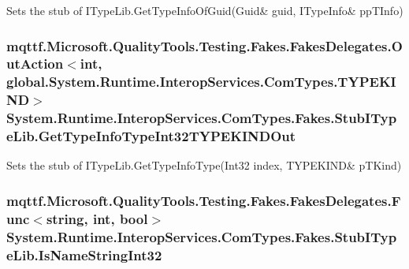 Sets the stub of I\-Type\-Lib.\-Get\-Type\-Info\-Of\-Guid(Guid\& guid, I\-Type\-Info\& pp\-T\-Info)

\hypertarget{class_system_1_1_runtime_1_1_interop_services_1_1_com_types_1_1_fakes_1_1_stub_i_type_lib_a513ec8c77d6a7c632a1a13e4b21d49e1}{
\subsubsection[{Get\-Type\-Info\-Type\-Int32\-T\-Y\-P\-E\-K\-I\-N\-D\-Out}]{\setlength{\rightskip}{0pt plus 5cm}mqttf.\-Microsoft.\-Quality\-Tools.\-Testing.\-Fakes.\-Fakes\-Delegates.\-Out\-Action$<$int, global.\-System.\-Runtime.\-Interop\-Services.\-Com\-Types.\-T\-Y\-P\-E\-K\-I\-N\-D$>$ System.\-Runtime.\-Interop\-Services.\-Com\-Types.\-Fakes.\-Stub\-I\-Type\-Lib.\-Get\-Type\-Info\-Type\-Int32\-T\-Y\-P\-E\-K\-I\-N\-D\-Out}}\label{class_system_1_1_runtime_1_1_interop_services_1_1_com_types_1_1_fakes_1_1_stub_i_type_lib_a513ec8c77d6a7c632a1a13e4b21d49e1}


Sets the stub of I\-Type\-Lib.\-Get\-Type\-Info\-Type(Int32 index, T\-Y\-P\-E\-K\-I\-N\-D\& p\-T\-Kind)

\hypertarget{class_system_1_1_runtime_1_1_interop_services_1_1_com_types_1_1_fakes_1_1_stub_i_type_lib_a684e70d09947bf0acb91653cfca3748e}{
\subsubsection[{Is\-Name\-String\-Int32}]{\setlength{\rightskip}{0pt plus 5cm}mqttf.\-Microsoft.\-Quality\-Tools.\-Testing.\-Fakes.\-Fakes\-Delegates.\-Func$<$string, int, bool$>$ System.\-Runtime.\-Interop\-Services.\-Com\-Types.\-Fakes.\-Stub\-I\-Type\-Lib.\-Is\-Name\-String\-Int32}}\label{class_system_1_1_runtime_1_1_interop_services_1_1_com_types_1_1_fakes_1_1_stub_i_type_lib_a684e70d09947bf0acb91653cfca3748e}


